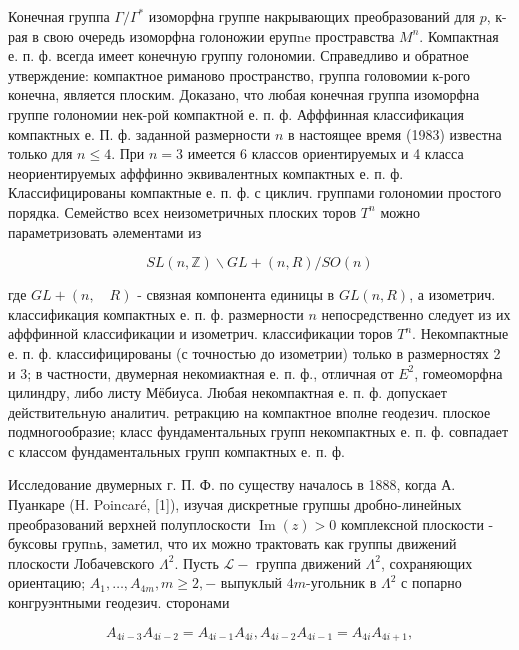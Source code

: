 \documentclass[10pt]{article}
\begin{document}
Конечная группа $\Gamma / \Gamma^{*}$ изоморфна группе накрывающих преобразований для $p$, к-рая в свою очередь изоморфна голоножии ерупne простравства $M^{n}$. Компактная е. п. ф. всегда имеет конечную группу голономии. Справедливо и обратное утверждение: компактное риманово пространство, группа головомии к-рого конечна, является плоским. Доказано, что любая конечная группа изоморфна группе голономии нек-рой компактной е. п. ф. Афффинная классификация компактных е. П. ф. заданной размерности $n$ в настоящее время (1983) известна только для $n \leqslant 4$. При $n=3$ имеется 6 классов ориентируемых и 4 класса неориентируемых афффинно эквивалентных компактных е. п. ф. Классифицированы компактные е. п. ф. с циклич. группами голономии простого порядка. Семейство всех неизометричных плоских торов $T^{n}$ можно параметризовать әлементами из



\[

S L(n, \mathbb{Z}) \backslash G L+(n, R) / S O(n)

\]



где $G L+(n, \quad R)$ - связная компонента единицы в $G L(n, R)$, а изометрич. классификация компактных е. п. ф. размерности $n$ непосредственно следует из их афффинной классификации и изометрич. классификации торов $T^{n}$. Некомпактные е. п. ф. классифицированы (с точностью до изометрии) только в размерностях 2 и 3; в частности, двумерная некомиактная е. п. ф., отличная от $E^{2}$, гомеоморфна цилиндру, либо листу Мёбиуса. Любая некомпактная е. п. ф. допускает действительную аналитич. ретракцию на компактное вполне геодезич. плоское подмногообразие; класс фундаментальных групп некомпактных е. п. ф. совпадает с классом фундаментальных групп компактных е. п. ф.



Исследование двумерных г. П. Ф. по существу началось в 1888, когда А. Пуанкаре (H. Poincaré, [1]), изучая дискретные групшы дробно-линейных преобразований верхней полуплоскости $\operatorname{Im}(z)>0$ комплексной плоскости - буксовы групnь, заметил, что их можно трактовать как группы движений плоскости Лобачевского $\Lambda^{2}$. Пусть $\mathscr{L}-$ группа движений $\Lambda^{2}$, сохраняющих ориентацию; $A_{1}, \ldots, A_{4 m}, m \geqslant 2,-$ выпуклый $4 m$-угольник в $\Lambda^{2}$ с попарно конгруэнтными геодезич. сторонами



\[

A_{4 i-3} A_{4 i-2}=A_{4 i-1} A_{4 i}, A_{4 i-2} A_{4 i-1}=A_{4 i} A_{4 i+1},

\]
\end{document}
